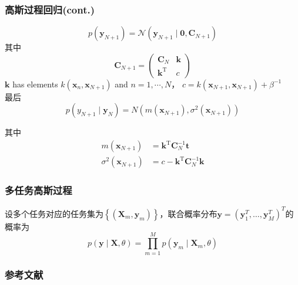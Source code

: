 \documentclass[aspectratio=169]{beamer}
\begin{document}
\begin{frame}
  \frametitle{高斯过程回归(cont.)}
  $$
  p\left(\mathbf{y}_{N+1}\right)=\mathcal{N}\left(\mathbf{y}_{N+1} \mid \mathbf{0}, \mathbf{C}_{N+1}\right)
  $$
  其中
  $$
  \mathbf{C}_{N+1}=\left(\begin{array}{cc}
  \mathbf{C}_{N} & \mathbf{k} \\
  \mathbf{k}^{\mathrm{T}} & c
  \end{array}\right)
  $$
  $\mathbf{k}$ has elements $k(\mathbf{x}_n,\mathbf{x}_{N+1})$ and $n = 1,\cdots,N$， $c=k\left(\mathbf{x}_{N+1}, \mathbf{x}_{N+1}\right)+\beta^{-1}$
  \\最后
  $$p(y_{N+1} \mid \mathbf{y}_{N}) = N(m\left(\mathbf{x}_{N+1}\right), \sigma^{2}\left(\mathbf{x}_{N+1}\right))$$
  
  其中
  $$\begin{aligned} m\left(\mathbf{x}_{N+1}\right) &=\mathbf{k}^{\mathrm{T}} \mathbf{C}_{N}^{-1} \mathbf{t} \\ \sigma^{2}\left(\mathbf{x}_{N+1}\right) &=c-\mathbf{k}^{\mathrm{T}} \mathbf{C}_{N}^{-1} \mathbf{k} \end{aligned}$$
\end{frame}

\begin{frame}
  \frametitle{多任务高斯过程}
  设多个任务对应的任务集为$\left\{\left(\mathbf{X}_{m}, \mathbf{y}_{m}\right)\right\}$，联合概率分布$\mathbf{y}=\left(\mathbf{y}_{1}^{T}, \ldots, \mathbf{y}_{M}^{T}\right)^{T}$的概率为
  $$p(\mathbf{y} \mid \mathbf{X}, \theta)=\prod_{m=1}^{M} p\left(\mathbf{y}_{m} \mid \mathbf{X}_{m}, \theta\right)$$

\end{frame}

\begin{frame}
\frametitle{参考文献}
\printbibliography
\end{frame}
\end{document}
